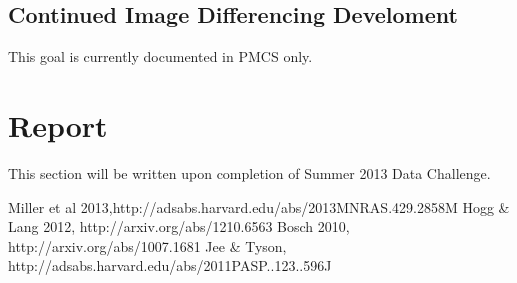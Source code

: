 \documentclass[12pt]{article}
\begin{document}
\subsection{Continued Image Differencing Develoment}

This goal is currently documented in PMCS only.

\section{Report}

This section will be written upon completion of Summer 2013 Data Challenge.

\begin{thebibliography}{1}
 Miller et al  2013,http://adsabs.harvard.edu/abs/2013MNRAS.429.2858M
 Hogg \& Lang 2012, http://arxiv.org/abs/1210.6563
 Bosch 2010, http://arxiv.org/abs/1007.1681
 Jee \& Tyson, http://adsabs.harvard.edu/abs/2011PASP..123..596J 
\end{thebibliography}
\end{document}
